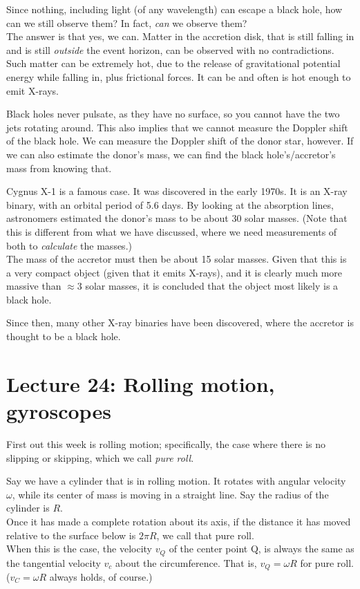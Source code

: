 \documentclass[8.01x]{subfiles}
\begin{document}
Since nothing, including light (of any wavelength) can escape a black hole, how can we still observe them? In fact, \emph{can} we observe them?\\
The answer is that yes, we can. Matter in the accretion disk, that is still falling in and is still \emph{outside} the event horizon, can be observed with no contradictions. Such matter can be extremely hot, due to the release of gravitational potential energy while falling in, plus frictional forces. It can be and often is hot enough to emit X-rays.

Black holes never pulsate, as they have no surface, so you cannot have the two jets rotating around. This also implies that we cannot measure the Doppler shift of the black hole. We can measure the Doppler shift of the donor star, however. If we can also estimate the donor's mass, we can find the black hole's/accretor's mass from knowing that.

Cygnus X-1 is a famous case. It was discovered in the early 1970s. It is an X-ray binary, with an orbital period of 5.6 days. By looking at the absorption lines, astronomers estimated the donor's mass to be about 30 solar masses. (Note that this is different from what we have discussed, where we need measurements of both to \emph{calculate} the masses.)\\
The mass of the accretor must then be about 15 solar masses. Given that this is a very compact object (given that it emits X-rays), and it is clearly much more massive than $\approx 3$ solar masses, it is concluded that the object most likely is a black hole.

Since then, many other X-ray binaries have been discovered, where the accretor is thought to be a black hole.

\section{Lecture 24: Rolling motion, gyroscopes}

First out this week is rolling motion; specifically, the case where there is no slipping or skipping, which we call \emph{pure roll}.

Say we have a cylinder that is in rolling motion. It rotates with angular velocity $\omega$, while its center of mass is moving in a straight line. Say the radius of the cylinder is $R$.\\
Once it has made a complete rotation about its axis, if the distance it has moved relative to the surface below is $2 \pi R$, we call that pure roll.\\
When this is the case, the velocity $v_Q$ of the center point Q, is always the same as the tangential velocity $v_c$ about the circumference. That is, $v_Q = \omega R$ for pure roll. ($v_C = \omega R$ always holds, of course.)
\end{document}
